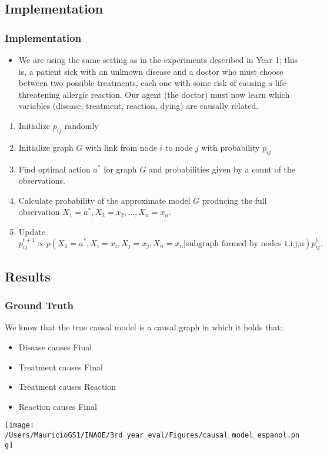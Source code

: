 \documentclass{beamer}
\theoremstyle{plain}
\begin{document}
\subsection{Implementation}
\begin{frame}
\frametitle{Implementation}
\begin{itemize}
\item We are using the same setting as in the experiments described in Year 1; this is, a patient sick with an unknown disease and a doctor who must choose between two possible treatments, each one with some risk of causing a life-threatening allergic reaction. Our agent (the doctor) must now learn which variables (disease, treatment, reaction, dying) are causally related.
\end{itemize}
\begin{enumerate}
\item Initialize $p_{ij}$ randomly
\item Initialize graph $G$ with link from node $i$ to node $j$ with probability $p_{ij}$
\item Find optimal action $a^\ast$ for graph $G$ and probabilities given by a count of the observations.
\item Calculate probability of the approximate model $G$ producing the full observation $X_1 = a^\ast, X_2=x_2,...,X_n=x_n$. 
\item Update $p_{ij}^{t+1} \propto p(X_1 = a^\ast, X_i = x_i, X_j=x_j, X_n=x_n | \textrm{subgraph formed by nodes 1,i,j,n})p_{ij}^t.$
\end{enumerate}
\end{frame}

\subsection{Results}
\begin{frame}
\frametitle{Ground Truth}
We know that the true causal model is a causal graph in which it holds that:
\begin{itemize}
\item Disease causes Final
\item Treatment causes Final
\item Treatment causes Reaction
\item Reaction causes Final
\end{itemize}
\end{frame}

\begin{frame}
\texttt{[image: /Users/MauricioGS1/INAOE/3rd\_year\_eval/Figures/causal\_model\_espanol.png]}
\end{frame}
\end{document}

